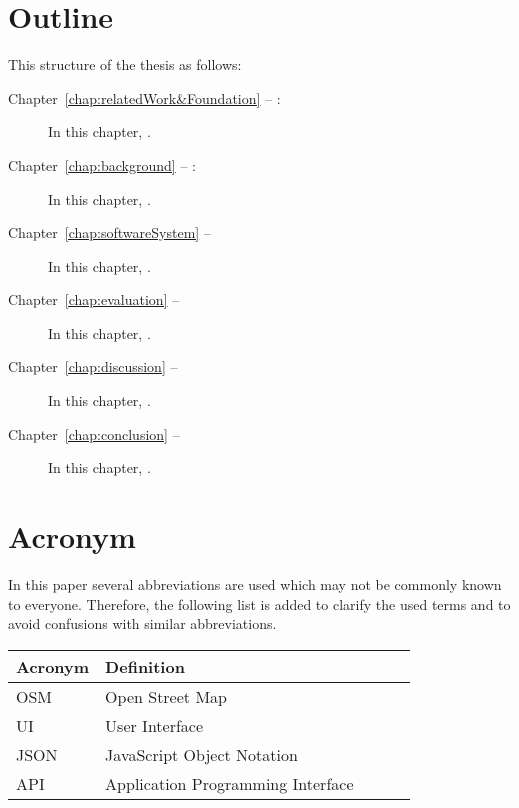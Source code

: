 \section*{Outline}
This structure of the thesis as follows:
\begin{description}

\item[Chapter~\ref{chap:relatedWork&Foundation} -- :] In this chapter, .

\item[Chapter~\ref{chap:background} -- :] In this chapter, .

\item[Chapter~\ref{chap:softwareSystem} -- ] In this chapter, .
 
\item[Chapter~\ref{chap:evaluation} -- ] In this chapter, .

\item[Chapter~\ref{chap:discussion} -- ] In this chapter, .

\item[Chapter~\ref{chap:conclusion} -- ] In this chapter, . %

\end{description}

\section*{Acronym}
In this paper several abbreviations are used which may not be commonly known to everyone. Therefore, the following list is added to clarify the used terms and to avoid confusions with similar abbreviations. 

\begin{table}[H]
\centering
\label{Acronym}
\begin{tabular}{l|llll}
\textbf{Acronym} & \textbf{Definition} &  \\ \hline
OSM         & Open Street Map & \\
UI         & User Interface &  \\
JSON		& JavaScript Object Notation & \\  
API		& Application Programming Interface & \\  
\end{tabular}
\end{table}


